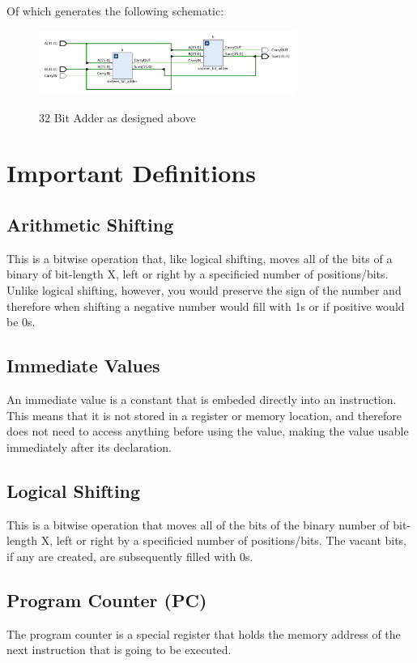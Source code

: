\documentclass{article}
\begin{document}
Of which generates the following schematic:
\begin{figure}[!htbp]
    \centering
    \caption{32 Bit Adder as designed above}
    \includegraphics[width=0.75\textwidth]{pictures/part1/thirtytwo_bit_adder.png}
    \label{32 Bit Adder}
\end{figure}



\newpage
\section{Important Definitions}

\subsection{Arithmetic Shifting}
\qquad
This is a bitwise operation that, like logical shifting, moves all of the bits of a binary of bit-length X, left or right by a specificied number of positions/bits. Unlike logical shifting, however, you would preserve the sign of the number and therefore when shifting a negative number would fill with 1s or if positive would be 0s.

\subsection{Immediate Values}
\qquad
An immediate value is a constant that is embeded directly into an instruction. This means that it is not stored in a register or memory location, and therefore does not need to access anything before using the value, making the value usable immediately after its declaration.

\subsection{Logical Shifting}
\qquad
This is a bitwise operation that moves all of the bits of the binary number of bit-length X, left or right by a specificied number of positions/bits. The vacant bits, if any are created, are subsequently filled with 0s.

\subsection{Program Counter (PC)}
\qquad
The program counter is a special register that holds the memory address of the next instruction that is going to be executed.
\end{document}
